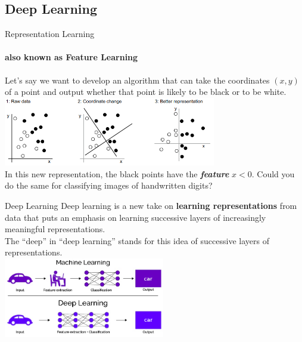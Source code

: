 \documentclass{beamer}
\begin{document}
    \subsection{Deep Learning}
    \begin{frame}{Representation Learning}
      \framesubtitle{also known as Feature Learning}%
      \justifying
      Let’s say we want to develop an algorithm that can take the  
      coordinates  $(x, y)$  of  a  point  and  output  whether  
      that point is likely to be black or to be white. \\
      \vfill
      \centering
      \includegraphics[height=30mm]{resources/rpl.png} \\
      In this new representation, the black points have
      the \textbf{\textit{feature}} $x < 0$.
      Could you do the same for classifying images of handwritten digits?
    \end{frame}
    \begin{frame}{Deep Learning}
      Deep learning is a new take on \textbf{learning representations}
      from data that puts an emphasis on learning successive
      layers of increasingly meaningful representations. \\ 
      The “deep” in “deep learning” stands  for this  
      idea  of  successive  layers  of  representations. \\
      \centering
      \vfill
      \includegraphics[height=35mm]{resources/mlvsdl}
    \end{frame}
    
\end{document}
